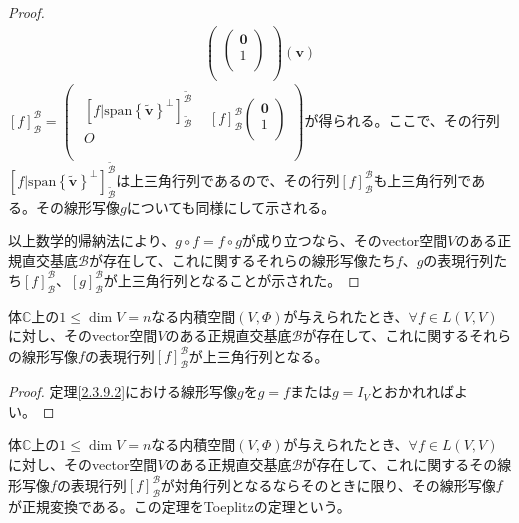 \documentclass[dvipdfmx]{jsarticle}
\begin{document}
\begin{proof}
\begin{align*}
{\begin{pmatrix}
\begin{pmatrix}
\mathbf{0} \\
1 \\
\end{pmatrix} \\
\end{pmatrix}}\left( \mathbf{v} \right)
\end{align*}
$[ f]_{\mathcal{B}}^{\mathcal{B}} = \begin{pmatrix}
\begin{matrix}
\left[ f|{{\mathrm{span}}\left\{ \widetilde{\mathbf{v}} \right\}}^{\bot} \right]_{\widetilde{\mathcal{B}}}^{\widetilde{\mathcal{B}}} \\
O \\
\end{matrix} & [ f]_{\mathcal{B}}^{\mathcal{B}}\begin{pmatrix}
\mathbf{0} \\
1 \\
\end{pmatrix} \\
\end{pmatrix}$が得られる。ここで、その行列$\left[ f|{{\mathrm{span}}\left\{ \widetilde{\mathbf{v}} \right\}}^{\bot} \right]_{\widetilde{\mathcal{B}}}^{\widetilde{\mathcal{B}}}$は上三角行列であるので、その行列$[ f]_{\mathcal{B}}^{\mathcal{B}}$も上三角行列である。その線形写像$g$についても同様にして示される。\par
以上数学的帰納法により、$g \circ f = f \circ g$が成り立つなら、そのvector空間$V$のある正規直交基底$\mathcal{B}$が存在して、これに関するそれらの線形写像たち$f$、$g$の表現行列たち$[ f]_{\mathcal{B}}^{\mathcal{B}}$、$[ g]_{\mathcal{B}}^{\mathcal{B}}$が上三角行列となることが示された。
\end{proof}
\begin{thm}\label{2.3.9.3}
体$\mathbb{C}$上の$1 \leq \dim V = n$なる内積空間$(V,\varPhi)$が与えられたとき、$\forall f \in L(V,V)$に対し、そのvector空間$V$のある正規直交基底$\mathcal{B}$が存在して、これに関するそれらの線形写像$f$の表現行列$[ f]_{\mathcal{B}}^{\mathcal{B}}$が上三角行列となる。
\end{thm}
\begin{proof} 定理\ref{2.3.9.2}における線形写像$g$を$g = f$または$g = I_{V}$とおかれればよい。
\end{proof}
\begin{thm}[Toeplitzの定理]\label{2.3.9.4}
体$\mathbb{C}$上の$1 \leq \dim V = n$なる内積空間$(V,\varPhi)$が与えられたとき、$\forall f \in L(V,V)$に対し、そのvector空間$V$のある正規直交基底$\mathcal{B}$が存在して、これに関するその線形写像$f$の表現行列$[ f]_{\mathcal{B}}^{\mathcal{B}}$が対角行列となるならそのときに限り、その線形写像$f$が正規変換である。この定理をToeplitzの定理という。\par
\end{thm}
\end{document}
